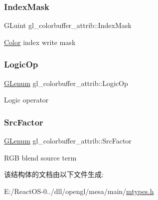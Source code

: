 \subsubsection{\texorpdfstring{Index\+Mask}{IndexMask}}
{\footnotesize\ttfamily G\+Luint gl\+\_\+colorbuffer\+\_\+attrib\+::\+Index\+Mask}

\hyperlink{struct_color}{Color} index write mask \mbox{\label{structgl__colorbuffer__attrib_a7ebb2076111c79ae1bd365675082050f}} 
\subsubsection{\texorpdfstring{Logic\+Op}{LogicOp}}
{\footnotesize\ttfamily \hyperlink{interfacevoid}{G\+Lenum} gl\+\_\+colorbuffer\+\_\+attrib\+::\+Logic\+Op}

Logic operator \mbox{\label{structgl__colorbuffer__attrib_a2856dce578f15a1c3b72320e1ef45104}} 
\subsubsection{\texorpdfstring{Src\+Factor}{SrcFactor}}
{\footnotesize\ttfamily \hyperlink{interfacevoid}{G\+Lenum} gl\+\_\+colorbuffer\+\_\+attrib\+::\+Src\+Factor}

R\+GB blend source term 

该结构体的文档由以下文件生成\+:\begin{DoxyCompactItemize}
\item 
E\+:/\+React\+O\+S-\/0../dll/opengl/mesa/main/\hyperlink{mtypes_8h}{mtypes.\+h}\end{DoxyCompactItemize}
